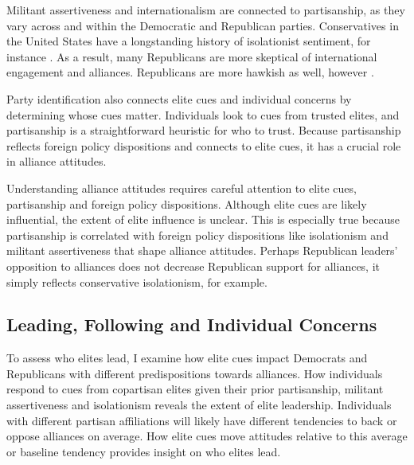\documentclass[12pt]{article}
\begin{document}
Militant assertiveness and internationalism are connected to partisanship, as they vary across and within the Democratic and Republican parties. 
Conservatives in the United States have a longstanding history of isolationist sentiment, for instance \citep{Kupchan2020}.
As a result, many Republicans are more skeptical of international engagement and alliances. 
Republicans are more hawkish as well, however \citep{Gries2014}. 


Party identification also connects elite cues and individual concerns by determining whose cues matter.
Individuals look to cues from trusted elites, and partisanship is a straightforward heuristic for who to trust. 
Because partisanship reflects foreign policy dispositions and connects to elite cues, it has a crucial role in alliance attitudes. 


Understanding alliance attitudes requires careful attention to elite cues, partisanship and foreign policy dispositions. 
Although elite cues are likely influential, the extent of elite influence is unclear. 
This is especially true because partisanship is correlated with foreign policy dispositions like isolationism and militant assertiveness that shape alliance attitudes. 
Perhaps Republican leaders' opposition to alliances does not decrease Republican support for alliances, it simply reflects conservative isolationism, for example. 





\subsection{Leading, Following and Individual Concerns}


To assess who elites lead, I examine how elite cues impact Democrats and Republicans with different predispositions towards alliances.
How individuals respond to cues from copartisan elites given their prior partisanship, militant assertiveness and isolationism reveals the extent of elite leadership. 
Individuals with different partisan affiliations will likely have different tendencies to back or oppose alliances on average. 
How elite cues move attitudes relative to this average or baseline tendency provides insight on who elites lead. 
\end{document}
